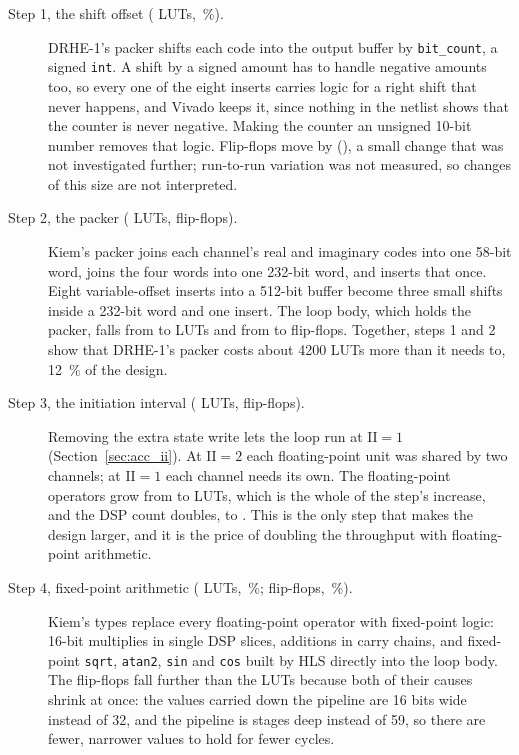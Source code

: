 \begin{description}
\item[Step 1, the shift offset (  LUTs,
\,\%).] DRHE-1's packer shifts each code into the output
buffer by \texttt{bit\_count}, a signed \texttt{int}. A shift by a signed
amount has to handle negative amounts too, so every one of the eight inserts
carries logic for a right shift that never happens, and Vivado keeps it,
since nothing in the netlist shows that the counter is never negative. Making the counter an
unsigned 10-bit number removes that logic. Flip-flops move by  (), a small change
that was not investigated further; run-to-run variation was not measured, so
changes of this size are not interpreted.

\item[Step 2, the packer (  LUTs,
  flip-flops).] Kiem's packer joins
each channel's real and imaginary codes into one 58-bit word, joins the four
words into one 232-bit word, and inserts that once. Eight variable-offset
inserts into a 512-bit buffer become three small shifts inside a 232-bit word
and one insert. The loop body, which holds the packer, falls from
 to  LUTs and from
 to  flip-flops. Together, steps 1
and 2 show that DRHE-1's packer costs about \num{4200} LUTs more than it needs
to, \SI{12}{\percent} of the design.

\item[Step 3, the initiation interval (
 LUTs,  
flip-flops).] Removing the extra state write lets the loop run at
$\mathrm{II} = 1$ (Section~\ref{sec:acc_ii}). At $\mathrm{II} = 2$ each
floating-point unit was shared by two channels; at $\mathrm{II} = 1$ each
channel needs its own. The floating-point operators grow from
 to  LUTs, which is the whole of the
step's increase, and the DSP count doubles, to . This is the
only step that makes the design larger, and it is the price of doubling the
throughput with floating-point arithmetic.

\item[Step 4, fixed-point arithmetic ( 
LUTs, \,\%;  
flip-flops, \,\%).] Kiem's types replace every
floating-point operator with fixed-point logic: 16-bit multiplies in single DSP
slices, additions in carry chains, and fixed-point \texttt{sqrt},
\texttt{atan2}, \texttt{sin} and \texttt{cos} built by HLS directly into the
loop body. The flip-flops fall further than the LUTs because both of their
causes shrink at once: the values carried down the pipeline are 16 bits wide
instead of 32, and the pipeline is  stages deep instead of
59, so there are fewer, narrower values to hold for fewer cycles.


\end{description}
